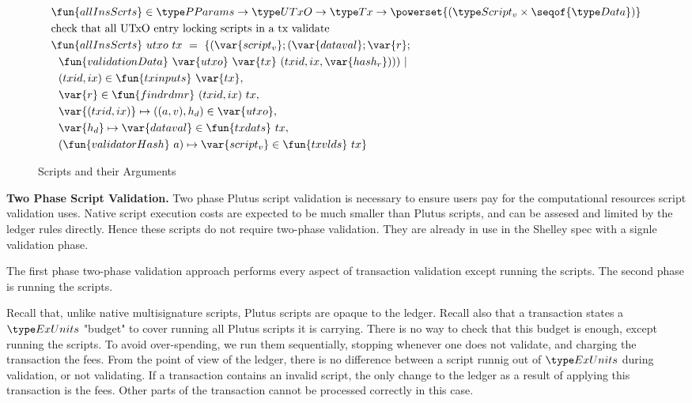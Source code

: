 \begin{figure}[htb]
  \begin{align*}
    & \fun{allInsScrts} \in \PParams \to \UTxO \to \Tx \to \powerset{(\ScriptV\times\seqof{\Data})} \\
    & \text{check that all UTxO entry locking scripts in a tx validate} \\
    & \fun{allInsScrts}~{utxo}~{tx}~=~ \{ (\var{script_v}; (\var{dataval};\var{r}; \\
    & ~~ \fun{validationData}~\var{utxo}~\var{tx}~
      (txid,ix,\var{hash_r}))) ~\vert \\
    & ~~(txid,ix) \in \fun{txinputs}~\var{tx}, \\
    & ~~\var{r} \in \fun{findrdmr}~{(txid,ix)}~{tx}, \\
    & ~~\var{(txid,ix)} \mapsto ((a,v),h_d) \in \var{utxo}, \\
    & ~~\var{h_d} \mapsto \var{dataval} \in \fun{txdats}~{tx}, \\
    & ~~(\fun{validatorHash}~{a})\mapsto \var{script_v}\in \fun{txvlds}~{tx} \}
  \end{align*}
  \caption{Scripts and their Arguments}
  \label{fig:functions:script3}
\end{figure}

\textbf{Two Phase Script Validation.}
Two phase Plutus script validation is necessary to ensure users pay for the
computational resources script validation uses.
Native script execution costs are expected to be much smaller than Plutus
scripts, and can be assesed and limited by the ledger rules directly.
Hence these scripts do not require two-phase validation. They are already
in use in the Shelley spec with a signle validation phase.

The first phase two-phase validation approach
performs every aspect of transaction validation except running the scripts.
The second phase is running the scripts.

Recall that, unlike native
multisignature scripts, Plutus scripts are opaque to the ledger. Recall also
that a transaction states a $\ExUnits$ "budget" to cover running all Plutus
scripts it is carrying. There is no way to check that this budget is enough,
except running the scripts. To avoid over-spending, we run them sequentially,
stopping whenever one does not validate, and charging the transaction the
fees. From the point of view of the ledger, there is no difference
between a script runnig out of $\ExUnits$ during validation, or not validating.
If a transaction contains an invalid script, the only change to the ledger
as a result of applying this transaction is the fees. Other parts of
the transaction cannot be processed correctly in this case.

